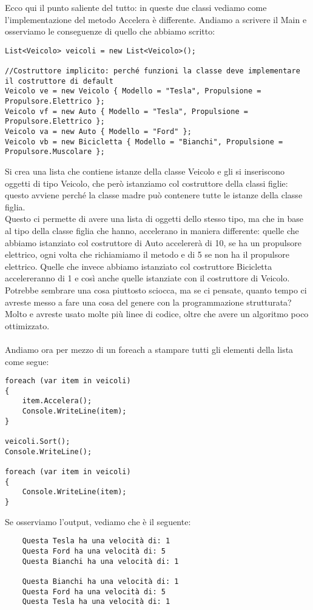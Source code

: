 \documentclass[]{article}
\begin{document}
Ecco qui il punto saliente del tutto: in queste due classi vediamo come l'implementazione
del metodo Accelera è differente. Andiamo a scrivere il Main e osserviamo le conseguenze
di quello che abbiamo scritto:
\begin{verbatim}
List<Veicolo> veicoli = new List<Veicolo>();

//Costruttore implicito: perché funzioni la classe deve implementare il costruttore di default
Veicolo ve = new Veicolo { Modello = "Tesla", Propulsione = Propulsore.Elettrico };
Veicolo vf = new Auto { Modello = "Tesla", Propulsione = Propulsore.Elettrico };
Veicolo va = new Auto { Modello = "Ford" };
Veicolo vb = new Bicicletta { Modello = "Bianchi", Propulsione = Propulsore.Muscolare };
\end{verbatim}
Si crea una lista che contiene istanze della classe Veicolo e gli si inseriscono oggetti
di tipo Veicolo, che però istanziamo col costruttore della classi figlie: questo avviene
perché la classe madre può contenere tutte le istanze della classe figlia. \\
Questo ci permette di avere una lista di oggetti dello stesso tipo, ma che in base al tipo
della classe figlia che hanno, accelerano in maniera differente: quelle che abbiamo istanziato col costruttore di Auto accelererà di 10, se ha un propulsore elettrico, ogni volta che richiamiamo il metodo e di 5 se non ha il propulsore elettrico. Quelle che invece
abbiamo istanziato col costruttore Bicicletta accelereranno di 1 e così anche quelle istanziate con il costruttore di Veicolo. \\
Potrebbe sembrare una cosa piuttosto sciocca, ma se ci pensate, quanto tempo ci avreste messo a fare una cosa del genere con la programmazione strutturata? Molto e avreste usato
molte più linee di codice, oltre che avere un algoritmo poco ottimizzato. \\ \\
Andiamo ora per mezzo di un foreach a stampare tutti gli elementi della lista come segue:
\begin{verbatim}
foreach (var item in veicoli)
{
	item.Accelera();
	Console.WriteLine(item);
}

veicoli.Sort();
Console.WriteLine();

foreach (var item in veicoli)
{
	Console.WriteLine(item);
}
\end{verbatim}
Se osserviamo l'output, vediamo che è il seguente:
\begin{verbatim}
	Questa Tesla ha una velocità di: 1
	Questa Ford ha una velocità di: 5
	Questa Bianchi ha una velocità di: 1
	
	Questa Bianchi ha una velocità di: 1
	Questa Ford ha una velocità di: 5
	Questa Tesla ha una velocità di: 1
\end{verbatim}
\end{document}
